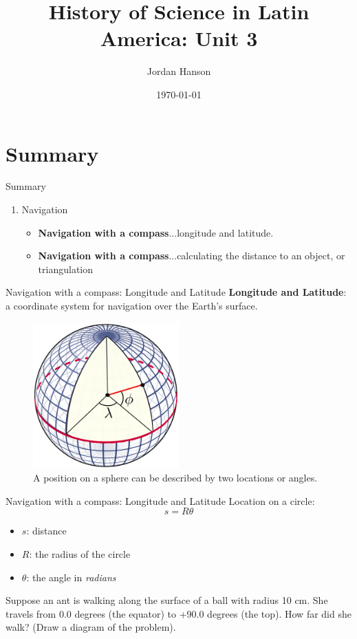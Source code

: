 \documentclass{beamer}
\title{History of Science in Latin America: Unit 3}
\date{\today}
\author{Jordan Hanson}
\institute{Whittier College Department of Physics and Astronomy}
\begin{document}
\maketitle

\section{Summary}

\begin{frame}{Summary}
\begin{enumerate}
\item Navigation
\begin{itemize}
\item \textbf{Navigation with a compass}...longitude and latitude.
\item \textbf{Navigation with a compass}...calculating the distance to an object, or triangulation
\end{itemize}
\end{enumerate}
\end{frame}

\begin{frame}{Navigation with a compass: Longitude and Latitude}
\textbf{Longitude and Latitude}: a coordinate system for navigation over the Earth's surface.
\begin{figure}
\centering
\includegraphics[width=0.5\textwidth]{latlon.pdf}
\caption{\label{fig:latlon} A position on a sphere can be described by two locations or angles.}
\end{figure}
\end{frame}

\begin{frame}{Navigation with a compass: Longitude and Latitude}
Location on a circle: 
\begin{equation}
s = R \theta \label{eq:latlon}
\end{equation}
\begin{itemize}
\item $s$: distance
\item $R$: the radius of the circle
\item $\theta$: the angle in \textit{radians}
\end{itemize}
Suppose an ant is walking along the surface of a ball with radius 10 cm.  She travels from 0.0 degrees (the equator) to +90.0 degrees (the top).  How far did she walk? (Draw a diagram of the problem).
\end{frame}
\end{document}
